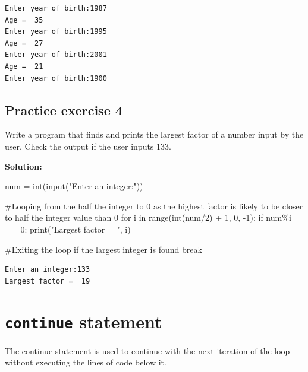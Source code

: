 \documentclass[
  letterpaper,
  DIV=11,
  numbers=noendperiod]{scrreprt}
\newenvironment{Shaded}{\begin{snugshade}}{\end{snugshade}}
\newcommand{\BuiltInTok}[1]{\textcolor[rgb]{0.00,0.23,0.31}{#1}}
\newcommand{\CommentTok}[1]{\textcolor[rgb]{0.37,0.37,0.37}{#1}}
\newcommand{\ControlFlowTok}[1]{\textcolor[rgb]{0.00,0.23,0.31}{#1}}
\newcommand{\DecValTok}[1]{\textcolor[rgb]{0.68,0.00,0.00}{#1}}
\newcommand{\KeywordTok}[1]{\textcolor[rgb]{0.00,0.23,0.31}{#1}}
\newcommand{\NormalTok}[1]{\textcolor[rgb]{0.00,0.23,0.31}{#1}}
\newcommand{\OperatorTok}[1]{\textcolor[rgb]{0.37,0.37,0.37}{#1}}
\newcommand{\StringTok}[1]{\textcolor[rgb]{0.13,0.47,0.30}{#1}}
\begin{document}
\begin{verbatim}
Enter year of birth:1987
Age =  35
Enter year of birth:1995
Age =  27
Enter year of birth:2001
Age =  21
Enter year of birth:1900
\end{verbatim}

\hypertarget{practice-exercise-4-1}{%
\subsection{Practice exercise 4}\label{practice-exercise-4-1}}

Write a program that finds and prints the largest factor of a number
input by the user. Check the output if the user inputs 133.

\textbf{Solution:}

\begin{Shaded}
\begin{Highlighting}[]
\NormalTok{num }\OperatorTok{=} \BuiltInTok{int}\NormalTok{(}\BuiltInTok{input}\NormalTok{(}\StringTok{"Enter an integer:"}\NormalTok{))}

\CommentTok{\#Looping from the half the integer to 0 as the highest factor is likely to be closer to half the integer value than 0}
\ControlFlowTok{for}\NormalTok{ i }\KeywordTok{in} \BuiltInTok{range}\NormalTok{(}\BuiltInTok{int}\NormalTok{(num}\OperatorTok{/}\DecValTok{2}\NormalTok{) }\OperatorTok{+} \DecValTok{1}\NormalTok{, }\DecValTok{0}\NormalTok{, }\OperatorTok{{-}}\DecValTok{1}\NormalTok{):}
    \ControlFlowTok{if}\NormalTok{ num}\OperatorTok{\%}\NormalTok{i }\OperatorTok{==} \DecValTok{0}\NormalTok{:}
        \BuiltInTok{print}\NormalTok{(}\StringTok{"Largest factor = "}\NormalTok{, i)}
        
        \CommentTok{\#Exiting the loop if the largest integer is found}
        \ControlFlowTok{break}
\end{Highlighting}
\end{Shaded}

\begin{verbatim}
Enter an integer:133
Largest factor =  19
\end{verbatim}

\hypertarget{continue-statement}{%
\section{\texorpdfstring{\texttt{continue}
statement}{continue statement}}\label{continue-statement}}

The
\href{https://docs.python.org/3/reference/simple_stmts.html\#the-continue-statement}{continue}
statement is used to continue with the next iteration of the loop
without executing the lines of code below it.
\end{document}
